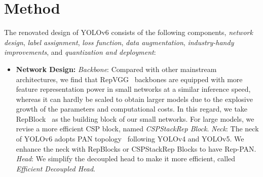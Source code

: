\documentclass[10pt,twocolumn,letterpaper]{article}
\begin{document}
\section{Method}
\label{sec:method}
The renovated design of YOLOv6 consists of the following components, \emph{network design}, \emph{label assignment}, \emph{loss function}, \emph{data augmentation}, \emph{industry-handy improvements}, and \emph{quantization and deployment}:
\begin{itemize}
  \item \textbf{Network Design:}
  \emph{Backbone}: Compared with other mainstream architectures, we find that RepVGG~\cite{ding2021repvgg} backbones are equipped with more feature representation power in small networks at a similar inference speed, whereas it can hardly be scaled to obtain larger models due to the explosive growth of the parameters and computational costs. In this regard, we take RepBlock~\cite{ding2021repvgg} as the building block of our small networks. For large models, we revise a more efficient CSP\cite{wang2020cspnet} block, named \emph{CSPStackRep Block}.
  \emph{Neck}: The neck of YOLOv6 adopts PAN topology~\cite{liu2018path} following YOLOv4 and YOLOv5. We enhance the neck with RepBlocks or CSPStackRep Blocks to have Rep-PAN.
  \emph{Head}: We simplify the decoupled head to make it more efficient, called \emph{Efficient Decoupled Head}.
 

\end{itemize}
\end{document}
